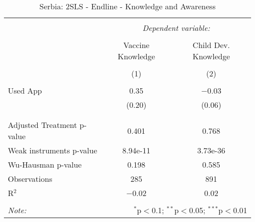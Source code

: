 
\begin{table}[!htbp] \centering 
  \caption{Serbia: 2SLS - Endline - Knowledge and Awareness} 
  \label{tbl:Serbia: 2SLS - Endline - Knowledge and Awareness} 
\begin{tabular}{@{\extracolsep{5pt}}lcc} 
\\[-1.8ex]\hline 
\hline \\[-1.8ex] 
 & \multicolumn{2}{c}{\textit{Dependent variable:}} \\ 
\cline{2-3} 
\\[-1.8ex] & Vaccine Knowledge & Child Dev. Knowledge \\ 
\\[-1.8ex] & (1) & (2)\\ 
\hline \\[-1.8ex] 
 Used App & 0.35 & $-$0.03 \\ 
  & (0.20) & (0.06) \\ 
  & & \\ 
\hline \\[-1.8ex] 
Adjusted Treatment p-value & 0.401 & 0.768 \\ 
Weak instruments p-value & 8.94e-11 & 3.73e-36 \\ 
Wu-Hausman p-value & 0.198 & 0.585 \\ 
Observations & 285 & 891 \\ 
R$^{2}$ & $-$0.02 & 0.02 \\ 
\hline 
\hline \\[-1.8ex] 
\textit{Note:}  & \multicolumn{2}{r}{$^{*}$p$<$0.1; $^{**}$p$<$0.05; $^{***}$p$<$0.01} \\ 
\end{tabular} 
\end{table} 
